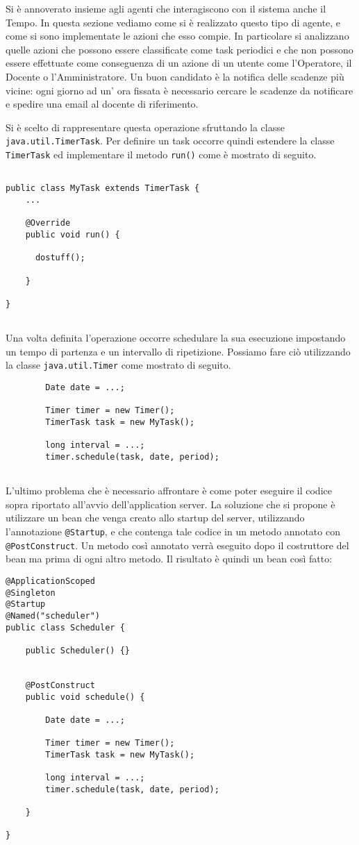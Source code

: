 Si è annoverato insieme agli agenti che interagiscono con il sistema anche il Tempo. In questa sezione vediamo come si è realizzato questo tipo di agente, e come si sono implementate le azioni che esso compie.
In particolare si analizzano quelle azioni che possono essere classificate come task periodici e che non possono essere effettuate come conseguenza di un azione di un utente come l'Operatore, il Docente o l'Amministratore.
Un buon candidato è la notifica delle scadenze più vicine: ogni giorno ad un' ora fissata è necessario cercare le scadenze da notificare e spedire una email al docente di riferimento.

Si è scelto di rappresentare questa operazione sfruttando la classe \texttt{java.util.TimerTask}. Per definire un task occorre quindi estendere la classe \texttt{TimerTask} ed implementare il metodo \texttt{run()} come è mostrato di seguito.
\begin{lstlisting}
 
public class MyTask extends TimerTask {
	...

	@Override
	public void run() {
	
	  dostuff();

	}

}
 
\end{lstlisting}

Una volta definita l'operazione occorre schedulare la sua esecuzione impostando un tempo di partenza e un intervallo di ripetizione. Possiamo fare ciò utilizzando la classe \texttt{java.util.Timer} come mostrato di seguito.

\begin{lstlisting}
		Date date = ...;

		Timer timer = new Timer();
		TimerTask task = new MyTask();

		long interval = ...;
		timer.schedule(task, date, period);
 
\end{lstlisting}

L'ultimo problema che è necessario affrontare è come poter eseguire il codice sopra riportato all'avvio dell'application server. La soluzione che si propone è utilizzare un bean che venga creato allo startup del server, utilizzando l'annotazione
 \texttt{@Startup}, e che contenga tale
codice in un metodo annotato con \texttt{@PostConstruct}. Un metodo così annotato verrà eseguito dopo il costruttore del bean ma prima di ogni altro metodo. Il risultato è quindi un bean così fatto:

\begin{lstlisting}
@ApplicationScoped
@Singleton
@Startup
@Named("scheduler")
public class Scheduler {

	public Scheduler() {}


	@PostConstruct
	public void schedule() {

		Date date = ...;

		Timer timer = new Timer();
		TimerTask task = new MyTask();

		long interval = ...;
		timer.schedule(task, date, period);

	}

}
\end{lstlisting}
